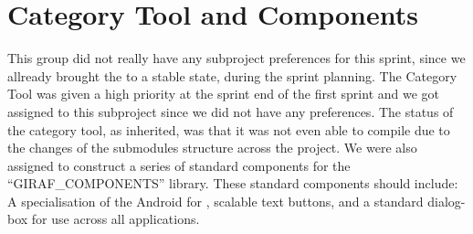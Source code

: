 \section{Category Tool and Components}

This group did not really have any subproject preferences for this sprint, since we allready brought the \launcher to a stable state, during the sprint planning. The \giraf Category Tool was given a high priority at the sprint end of the first sprint and we got assigned to this subproject since we did not have any preferences. The status of the category tool, as inherited, was that it was not even able to compile due to the changes of the submodules structure across the project. We were also assigned to construct a series of standard components for the ``GIRAF_COMPONENTS'' library. These standard components should include: A specialisation of the Android  for \giraf, scalable text buttons, and a standard dialog-box for use across all applications. 